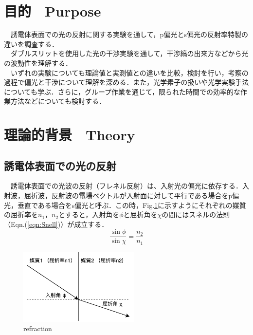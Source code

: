 



\fontsize{11.041pt}{16.562pt}\selectfont




\section{目的　Purpose}
　誘電体表面での光の反射に関する実験を通して，p偏光とs偏光の反射率特製の違いを調査する．\\
　ダブルスリットを使用した光の干渉実験を通して，干渉縞の出来方などから光の波動性を理解する．\\
　いずれの実験についても理論値と実測値との違いを比較，検討を行い，考察の過程で偏光と干渉について理解を深める．また，光学素子の扱いや光学実験手法についても学ぶ．さらに，グループ作業を通じて，限られた時間での効率的な作業方法などについても検討する．


\section{理論的背景　Theory}
\subsection{誘電体表面での光の反射}
　誘電体表面での光波の反射（フレネル反射）は、入射光の偏光に依存する．入射波，屈折波，反射波の電場ベクトルが入射面に対して平行である場合をp偏光，垂直である場合をs偏光と呼ぶ．この時，Fig.\ref{fig:refraction}に示すようにそれぞれの媒質の屈折率を$n_1$，$n_2$とすると，入射角を$\phi$と屈折角を$\chi$の間にはスネルの法則（Eqn.(\ref{eqn:Snell})）が成立する．
\begin{equation}
    \frac{\sin \phi}{\sin \chi} = \frac{n_2}{n_1}
    \label{eqn:Snell}
\end{equation}

\begin{figure}[H]
    \centering
    \includegraphics[width=6cm]{./fig/fig1.pdf}
    \caption{refraction}
    \label{fig:refraction}
\end{figure}


